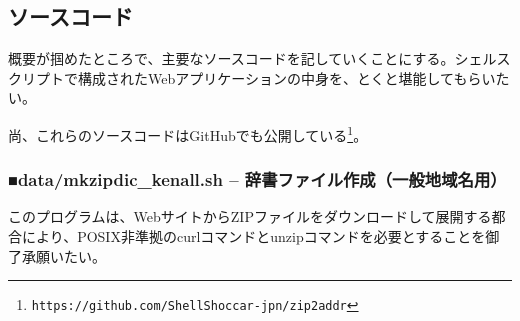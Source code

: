 \subsection*{ソースコード}

概要が掴めたところで、主要なソースコードを記していくことにする。シェルスクリプトで構成されたWebアプリケーションの中身を、とくと堪能してもらいたい。

尚、これらのソースコードはGitHubでも公開している\footnote{\verb|https://github.com/ShellShoccar-jpn/zip2addr|}。

\subsubsection*{■data/mkzipdic\_{}kenall.sh -- 辞書ファイル作成（一般地域名用）}

このプログラムは、WebサイトからZIPファイルをダウンロードして展開する都合により、POSIX非準拠のcurlコマンドとunzipコマンドを必要とすることを御了承願いたい。


